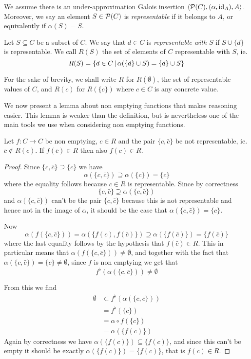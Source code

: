 We assume there is an under-approximation Galois insertion $\langle \mathcal{P}(C), (\alpha, \text{id}_{A}), A \rangle$. Moreover, we say an element $S \in \mathcal{P}(C)$ is \textit{representable} if it belongs to $A$, or equivalently if $\alpha(S) = S$.

\begin{definition}\label{ch3:def:repr-with-set}
	Let $S \subseteq C$ be a subset of $C$. We say that $d \in C$ is \textit{representable with $S$} if $S \cup \{ d \}$ is representable. We call $R(S)$ the set of elements of $C$ representable with $S$, ie.
	\[
	R(S) = \{ d \in C \,\vert\, \alpha(\{ d \} \cup S) = \{ d \} \cup S \}
	\]
\end{definition}
For the sake of brevity, we shall write $R$ for $R(\emptyset)$, the set of representable values of $C$, and $R(c)$ for $R(\{ c \})$ where $c \in C$ is any concrete value.

We now present a lemma about non emptying functions that makes reasoning easier. This lemma is weaker than the definition, but is nevertheless one of the main tools we use when considering non emptying functions.

\begin{lemma}\label{ch3:th:f-non-repr-pair}
	Let $f: C \rightarrow C$ be non emptying, $c \in R$ and the pair $\{ c, \bar{c} \}$ be not representable, ie. $\bar{c} \notin R(c)$. If $f(\bar{c}) \in R$ then also $f(c) \in R$.
\end{lemma}
\begin{proof}
	Since $\{ c, \bar{c} \} \supseteq \{ c \}$ we have
	\[
	\alpha(\{ c, \bar{c} \}) \supseteq \alpha(\{ c \}) = \{ c \}
	\]
	where the equality follows because $c \in R$ is representable. Since by correctness
	\[
	\{ c, \bar{c} \} \supseteq \alpha(\{ c, \bar{c} \})
	\]
	and $\alpha(\{ c, \bar{c} \})$ can't be the pair $\{ c, \bar{c} \}$ because this is not representable and hence not in the image of $\alpha$, it should be the case that $\alpha(\{ c, \bar{c} \}) = \{ c \}$.

	Now
	\[
	\alpha(f(\{ c, \bar{c} \})) = \alpha(\{ f(c), f(\bar{c}) \}) \supseteq \alpha(\{ f(\bar{c}) \}) = \{ f(\bar{c}) \}
	\]
	where the last equality follows by the hypothesis that $f(\bar{c}) \in R$.
	This in particular means that $\alpha(f(\{ c, \bar{c} \})) \neq \emptyset$, and together with the fact that $\alpha(\{ c, \bar{c} \}) = \{ c \} \neq \emptyset$, since $f$ is non emptying we get that
	\[
	f^{\flat}(\alpha(\{ c, \bar{c} \})) \neq \emptyset
	\]

	From this we find
	\begin{align*}
		\emptyset &\subset f^{\flat}(\alpha(\{ c, \bar{c} \})) \\
		&= f^{\flat}(\{ c \}) \\
		&= \alpha \circ f(\{ c \}) \\
		&= \alpha(\{ f(c) \})
	\end{align*}
	Again by correctness we have $\alpha(\{ f(c) \}) \subseteq \{ f(c)\}$, and since this can't be empty it should be exactly $\alpha(\{ f(c) \}) = \{ f(c) \}$, that is $f(c) \in R$.
\end{proof}

